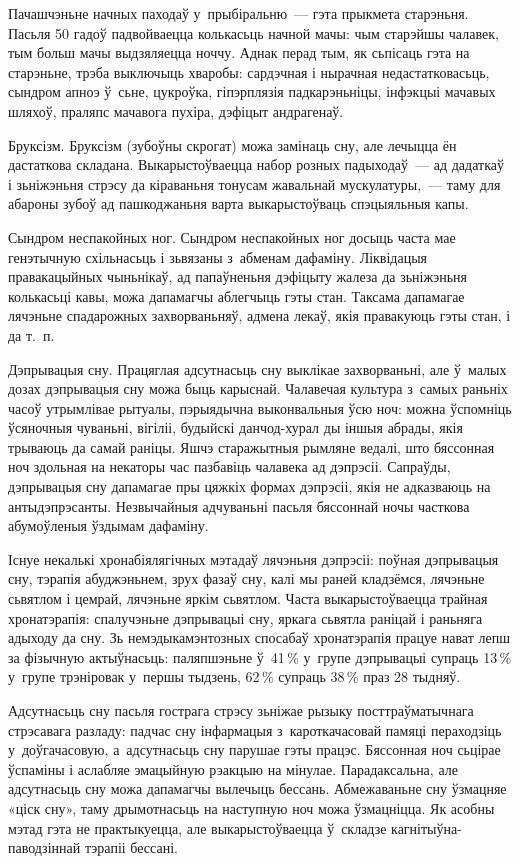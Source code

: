 Пачашчэньне начных паходаў у~прыбіральню~--- гэта прыкмета старэньня. Пасьля 50 гадоў падвойваецца колькасьць начной мачы: чым старэйшы чалавек, тым больш мачы выдзяляецца ноччу. Аднак перад тым, як сьпісаць гэта на старэньне, трэба выключыць хваробы: сардэчная і нырачная недастатковасьць, сындром апноэ ў~сьне, цукроўка, гіпэрплязія падкарэньніцы, інфэкцыі мачавых шляхоў, праляпс мачавога пухіра, дэфіцыт андрагенаў.

Бруксізм. Бруксізм (зубоўны скрогат) можа замінаць сну, але лечыцца ён дастаткова складана. Выкарыстоўваецца набор розных падыходаў~--- ад дадаткаў і зьніжэньня стрэсу да кіраваньня тонусам жавальнай мускулатуры,~--- таму для абароны зубоў ад пашкоджаньня варта выкарыстоўваць спэцыяльныя капы. 

Сындром неспакойных ног. Сындром неспакойных ног досыць часта мае генэтычную схільнасьць і зьвязаны з~абменам дафаміну. Ліквідацыя правакацыйных чыньнікаў, ад папаўненьня дэфіцыту жалеза да зьніжэньня колькасьці кавы, можа дапамагчы аблегчыць гэты стан. Таксама дапамагае лячэньне спадарожных захворваньняў, адмена лекаў, якія правакуюць гэты стан, і да т.~п.

Дэпрывацыя сну. Працяглая адсутнасьць сну выклікае захворваньні, але ў~малых дозах дэпрывацыя сну можа быць карыснай. Чалавечая культура з~самых раньніх часоў утрымлівае рытуалы, пэрыядычна выконвальныя ўсю ноч: можна ўспомніць ўсяночныя чуваньні, вігіліі, будыйскі данчод-хурал ды іншыя абрады, якія трываюць да самай раніцы. Яшчэ старажытныя рымляне ведалі, што бяссонная ноч здольная на некаторы час пазбавіць чалавека ад дэпрэсіі. Сапраўды, дэпрывацыя сну дапамагае пры цяжкіх формах дэпрэсіі, якія не адказваюць на антыдэпрэсанты. Незвычайныя адчуваньні пасьля бяссоннай ночы часткова абумоўленыя ўздымам дафаміну.

Існуе некалькі хронабіялягічных мэтадаў лячэньня дэпрэсіі: поўная дэпрывацыя сну, тэрапія абуджэньнем, зрух фазаў сну, калі мы раней кладзёмся, лячэньне сьвятлом і цемрай, лячэньне яркім сьвятлом. Часта выкарыстоўваецца трайная хронатэрапія: спалучэньне дэпрывацыі сну, яркага сьвятла раніцай і раньняга адыходу да сну. Зь немэдыкамэнтозных спосабаў хронатэрапія працуе нават лепш за фізычную актыўнасьць: паляпшэньне ў~41\,\% у~групе дэпрывацыі супраць 13\,\% у~групе трэніровак у~першы тыдзень, 62\,\% супраць 38\,\% праз 28 тыдняў.

Адсутнасьць сну пасьля гострага стрэсу зьніжае рызыку посттраўматычнага стрэсавага разладу: падчас сну інфармацыя з~кароткачасовай памяці пераходзіць у~доўгачасовую, а~адсутнасьць сну парушае гэты працэс. Бяссонная ноч сьцірае ўспаміны і аслабляе эмацыйную рэакцыю на мінулае. Парадаксальна, але адсутнасьць сну можа дапамагчы вылечыць бессань. Абмежаваньне сну ўзмацняе «ціск сну», таму дрымотнасьць на наступную ноч можа ўзмацніцца. Як асобны мэтад гэта не практыкуецца, але выкарыстоўваецца ў~складзе кагнітыўна-паводзіннай тэрапіі бессані.

